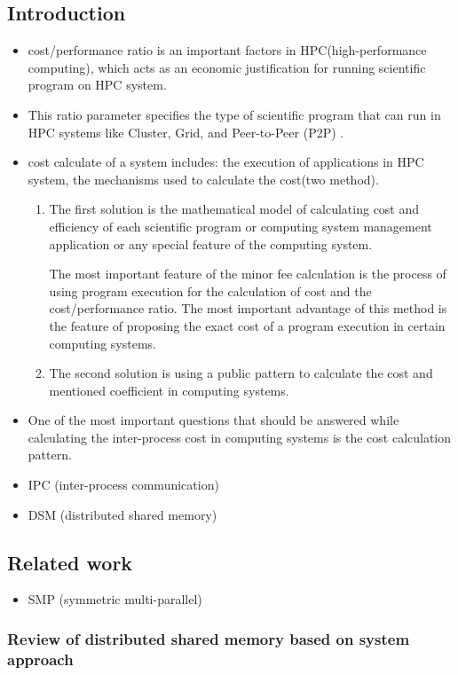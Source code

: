 \documentclass[11pt]{article}
\begin{document}
\subsection{Introduction}
\label{sec-2-1}
\begin{itemize}
\item cost/performance ratio is an important factors in HPC(high-performance computing), which acts as an economic justification for running scientific program on HPC system.
\item This ratio parameter specifies the type of scientific program that can run in HPC systems like Cluster, Grid, and Peer-to-Peer (P2P) \cite{thackston15_perfor_low_cost_commer_cloud}.
\item cost calculate of a system includes: the execution of applications in HPC system, the mechanisms used to calculate the cost(two method).
\begin{enumerate}
\item The first solution is the mathematical model of calculating cost and efficiency of each scientific program or computing system management application or any special feature of the computing system.

The most important feature of the minor fee calculation is the process of using program execution for the calculation of cost and the cost/performance ratio.
The most important advantage of this method is the feature of proposing the exact cost of a program execution in certain computing systems.

\item The second solution is using a public pattern to calculate the cost and mentioned coefficient in computing systems.
\end{enumerate}
\item One of the most important questions that should be answered while calculating the inter-process cost in computing systems is the cost calculation pattern.
\item IPC (inter-process communication)
\item DSM (distributed shared memory)
\end{itemize}
\subsection{Related work}
\label{sec-2-2}
\begin{itemize}
\item SMP (symmetric multi-parallel)
\end{itemize}
\subsubsection{Review of distributed shared memory based on system approach}
\label{sec-2-2-1}
\end{document}
